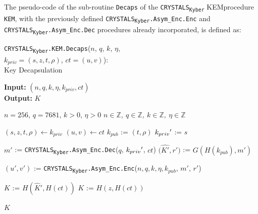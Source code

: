\documentclass[runningheads]{llncs}
\numberwithin{equation}{section}
\begin{document}
    \noindent The pseudo-code of the sub-routine \texttt{Decaps} of the \texorpdfstring{\texttt{CRYSTALS}\textsubscript{\texttt{Kyber}}}\/ KEM\break procedure \texttt{KEM}, with the previously defined \texorpdfstring{\texttt{CRYSTALS}\textsubscript{\texttt{Kyber}}\texttt{.Asym\_Enc}\texttt{.Enc}}\/ and \texorpdfstring{\texttt{CRYSTALS}\textsubscript{\texttt{Kyber}}\texttt{.Asym\_Enc}\texttt{.Dec}}\/ procedures already incorporated, is defined as:
    \vspace{-3ex}
    \begin{algorithm}
        \caption{\texorpdfstring{\texttt{CRYSTALS}\textsubscript{\texttt{Kyber}}\texttt{.KEM}\texttt{.Decaps}($n$, $q$, $k$, $\eta$,\\ \phantom{|..................................................................} ${k}_{priv} = (s, z, t, \rho)$, $ct = (u, v)$)}\/:\\ \phantom{............................................................................................}Key Decapsulation}
        \label{subrou:crystals-kyber-asymmetric-encryption-decaps}
        
        \textbf{Input:} $\left( n, q, k, \eta, {k}_{priv}, ct \right)$\\
        \textbf{Output:} $ K $
  
        \begin{algorithmic}[1]
            \Require $n = 256$, $q = 7681$, $k > 0$, $\eta > 0$
            \Ensure $n \in \mathbb{Z},\ q \in \mathbb{Z},\ k \in \mathbb{Z},\ \eta \in \mathbb{Z}$
            
            \vspace{2ex}

            \State $(s,z,t,\rho) \gets {k}_{priv}$
            \State $(u,v) \gets ct$
            \State ${k}_{pub}$ := $(t, \rho)$
            \State ${k}_{priv}\/'$ := $s$
            
            \vspace{1ex}
            
            \State $m'$ := \texorpdfstring{\texttt{CRYSTALS}\textsubscript{\texttt{Kyber}}\texttt{.Asym\_Enc}\texttt{.Dec}}\/($q$, ${k}_{priv}\/'$, $ct$)
            \State $\big( \hat{K'}, r' \big)$ := $G( H( {k}_{pub} ) , m' )$
            
            \vspace{1ex}

            \State $\left( u', v' \right)$ := \texorpdfstring{\texttt{CRYSTALS}\textsubscript{\texttt{Kyber}}\texttt{.Asym\_Enc}\texttt{.Enc}}\/($n, q, k, \eta,{k}_{pub}$, $m'$, $r'$)
            
            \vspace{1ex}

                \State $K$ := $H(\hat{K}', H(ct))$
            \Else
                \State $K$ := $H(z, H(ct))$
            \EndIf
            
            \vspace{1ex}
            
            \State \Return $K$
        \end{algorithmic}
    \end{algorithm}
\end{document}
